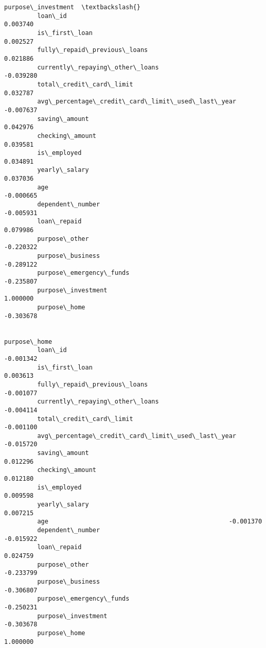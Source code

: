 \documentclass{report}
\begin{document}
\begin{Verbatim}[commandchars=\\\{\}]
                                                          purpose\_investment  \textbackslash{}
         loan\_id                                                    0.003740   
         is\_first\_loan                                              0.002527   
         fully\_repaid\_previous\_loans                                0.021886   
         currently\_repaying\_other\_loans                            -0.039280   
         total\_credit\_card\_limit                                    0.032787   
         avg\_percentage\_credit\_card\_limit\_used\_last\_year           -0.007637   
         saving\_amount                                              0.042976   
         checking\_amount                                            0.039581   
         is\_employed                                                0.034891   
         yearly\_salary                                              0.037036   
         age                                                       -0.000665   
         dependent\_number                                          -0.005931   
         loan\_repaid                                                0.079986   
         purpose\_other                                             -0.220322   
         purpose\_business                                          -0.289122   
         purpose\_emergency\_funds                                   -0.235807   
         purpose\_investment                                         1.000000   
         purpose\_home                                              -0.303678   
         
                                                          purpose\_home  
         loan\_id                                             -0.001342  
         is\_first\_loan                                        0.003613  
         fully\_repaid\_previous\_loans                         -0.001077  
         currently\_repaying\_other\_loans                      -0.004114  
         total\_credit\_card\_limit                             -0.001100  
         avg\_percentage\_credit\_card\_limit\_used\_last\_year     -0.015720  
         saving\_amount                                        0.012296  
         checking\_amount                                      0.012180  
         is\_employed                                          0.009598  
         yearly\_salary                                        0.007215  
         age                                                 -0.001370  
         dependent\_number                                    -0.015922  
         loan\_repaid                                          0.024759  
         purpose\_other                                       -0.233799  
         purpose\_business                                    -0.306807  
         purpose\_emergency\_funds                             -0.250231  
         purpose\_investment                                  -0.303678  
         purpose\_home                                         1.000000  
\end{Verbatim}
        
\end{document}
